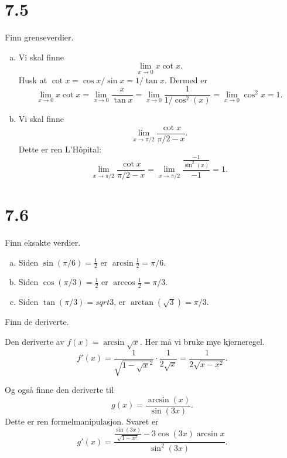 \documentclass[11pt, norsk]{article}
\begin{document}
\section{7.5}
\begin{oppg}[7.5.3ab]
Finn grenseverdier.
\end{oppg}

\begin{losn}
  \begin{enumerate}[a)]
  \item Vi skal finne
$$
\lim_{x \to 0} x \cot x.
$$
Husk at $\cot x = \cos x /\sin x = 1/\tan x$. Dermed er
$$
\lim_{x \to 0} x \cot x = \lim_{x \to 0} \frac{x}{\tan x} = \lim_{x \to 0} \frac{1}{1/\cos^2(x)} = \lim_{x \to 0} \cos^2 x = 1.
$$
\item Vi skal finne
$$
\lim_{x \to \pi/2} \frac{\cot x}{\pi/2 - x}.
$$
Dette er ren L'Hôpital:
$$
\lim_{x \to \pi/2} \frac{\cot x}{\pi/2 - x} = \lim_{x \to \pi/2} \frac{\frac{-1}{\sin^2(x)}}{-1} = 1.
$$
  \end{enumerate}
\end{losn}

\section{7.6}
\begin{oppg}
  Finn eksakte verdier.
\end{oppg}
\begin{losn}
  \begin{enumerate}[a)]
  \item Siden $\sin(\pi/6)=\frac 12$ er $\arcsin \frac 12 = \pi/6$. 
\item Siden $\cos(\pi/3)= \frac 12$ er $\arccos \frac 12 = \pi/3$. 
\item Siden $\tan(\pi/3) = sqrt{3}$, er $\arctan(\sqrt 3) = \pi/3$.
  \end{enumerate}
\end{losn}

\begin{oppg}
  Finn de deriverte.
\end{oppg}
\begin{losn}
  Den deriverte av $f(x) = \arcsin \sqrt {x}$. Her må vi bruke mye kjerneregel.
$$
f'(x) = \frac{1}{\sqrt{1-\sqrt{x}^2}} \cdot \frac{1}{2\sqrt{x}} = \frac{1}{2\sqrt{x-x^2}}.
$$

Og også finne den deriverte til 
$$
g(x) = \frac{\arcsin(x)}{\sin (3x)}.
$$
Dette er ren formelmanipulasjon. Svaret er
$$
g'(x) = \frac{\frac{\sin (3x)}{\sqrt{1-x^2}} - 3\cos(3x) \arcsin x}{\sin^2 (3x)}.
$$
\end{losn}
\end{document}
